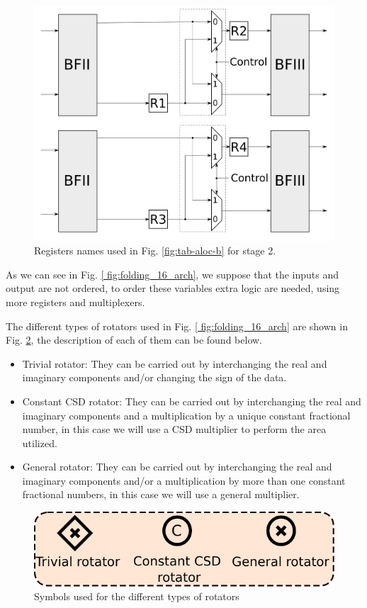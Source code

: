 \documentclass[journal,comsoc]{IEEEtran}
\begin{document}
\begin{figure} 
    \centering
    \includegraphics[width= 0.85\linewidth]{Diagramas/folding_stage2.png}
    \caption{Registers names used in Fig. \ref{fig:tab-aloc-b} for stage 2.}
    \label{fig:folding16_stage2}
\end{figure}
        



As we can see in Fig. \ref{ fig:folding_16_arch}, we suppose that the inputs and output are not ordered, to order these variables extra logic are needed, using more registers and multiplexers.

The different types of rotators used in Fig. \ref{ fig:folding_16_arch} are shown in Fig. \ref{fig:rotators}, the description of each of them can be found below.
\begin{itemize}
	\item Trivial rotator: They can be carried out by interchanging the real and imaginary components and/or changing the sign of the data.
	\item Constant CSD rotator: They can be carried out by interchanging the real and imaginary components and a multiplication by a unique constant fractional number, in this case we will use a CSD multiplier to perform the area utilized.
	\item General rotator: They can be carried out by interchanging the real and imaginary components and/or a multiplication by more than one constant fractional numbers, in this case we will use a general multiplier.
\end{itemize}

\begin{figure} 
	\centering
	\includegraphics[width=0.6\linewidth]{Diagramas/miSeccionFiguras/Rotadores.pdf}
	\caption{Symbols used for the different types of rotators}
	\label{fig:rotators}
\end{figure}
\end{document}
